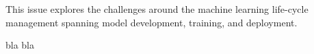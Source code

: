 \documentclass[11pt]{article}
\begin{document}
This issue explores the challenges around the machine learning  life-cycle management spanning model development, training, and deployment.

bla bla
\end{document}
